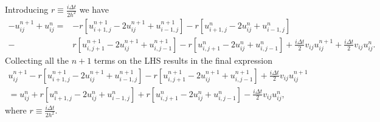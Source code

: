 \documentclass[english,notitlepage,reprint,nofootinbib]{revtex4-1}  %
\begin{document}
Introducing  $r \equiv \frac{i \Delta t}{2h^2}$ we have
\begin{align}
    - u_{ij}^{n+1} + u_{ij}^n
    = & - r \left[ {u_{i+1,j}^{n+1} -2u_{ij}^{n+1} + u_{i-1,j}^{n+1}} \right]
    - r \left[ {u_{i+1,j}^{n} -2u_{ij}^{n} + u_{i-1,j}^{n}}\right]             \nonumber \\
    - & r \left[ {u_{i,j+1}^{n+1} -2u_{ij}^{n+1} + u_{i,j-1}^{n+1}} \right]
    - r \left[ {u_{i,j+1}^{n} -2u_{ij}^{n} + u_{i,j-1}^{n}}\right]
    + \frac{i\Delta t}{2} v_{ij}u_{ij}^{n+1} + \frac{i\Delta t}{2} v_{ij}u_{ij}^n.
\end{align}
Collecting all the $n+1$ terms on the LHS results in the final expression
\begin{align}
    u_{ij}^{n+1} - r \left[ u_{i+1,j}^{n+1}- 2 u_{ij}^{n+1} + u_{i-1,j}^{n+1} \right]
    - r \left[ u_{i,j+1}^{n+1}- 2 u_{ij}^{n+1} + u_{i,j-1}^{n+1} \right]
    + \frac{i \Delta t}{2} v_{ij} u_{ij}^{n+1}  \nonumber \\
    = u_{ij}^n
    + r \left[ u_{i+1,j}^{n}- 2 u_{ij}^{n} + u_{i-1,j}^{n} \right]
    + r \left[ u_{i,j+1}^{n}- 2 u_{ij}^{n} + u_{i,j-1}^{n} \right]
    - \frac{i \Delta t}{2} v_{ij} u_{ij}^{n},
\end{align}
where $r \equiv \frac{i \Delta t}{2h^2}$.
\end{document}

